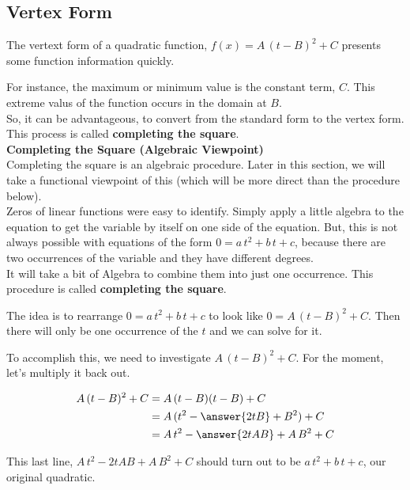 \documentclass{ximera}
\begin{document}
\subsection*{Vertex Form}







The vertext form of a quadratic function, $f(x) = A \, (t-B)^2 + C$ presents some function information quickly.


For instance, the maximum or minimum value is the constant term, $C$.  This extreme valus of the function occurs in the domain at $B$. \\


So, it can be advantageous, to convert from the standard form to the vertex form.  This process is called \textbf{completing the square}. \\




\textbf{\textcolor{blue!55!black}{Completing the Square (Algebraic Viewpoint)}} \\

Completing the square is an algebraic procedure.  Later in this section, we will take a functional viewpoint of this (which will be more direct than the procedure below). \\



Zeros of linear functions were easy to identify.  Simply apply a little algebra to the equation to get the variable by itself on one side of the equation.  But, this is not always possible with equations of the form $0 = a \, t^2 + b \, t + c $, because there are two occurrences of the variable and they have different degrees. \\


It will take a bit of Algebra to combine them into just one occurrence. This procedure is called \textbf{completing the square}. \\



\begin{idea}


The idea is to rearrange  $0 = a \, t^2 + b \, t + c$ to look like $0 = A \, (t-B)^2 + C$.  Then there will only be  one occurrence of the $t$ and we can solve for it.


To accomplish this, we need to investigate $A \, (t-B)^2 + C$. For the moment, let's multiply it back out.


\begin{align*}
A \, (t-B)^2 + C & = A \, (t-B)(t-B) + C \\
& = A \, (t^2 - \answer{2 t B} + B^2) + C  \\
& = A \, t^2 - \answer{2 t A B} + A \, B^2 + C
\end{align*}

This last line, $A \, t^2 - 2 t A B + A \, B^2 + C$ should turn out to be $a \, t^2 + b \, t + c$, our original quadratic.

\end{idea}
\end{document}
